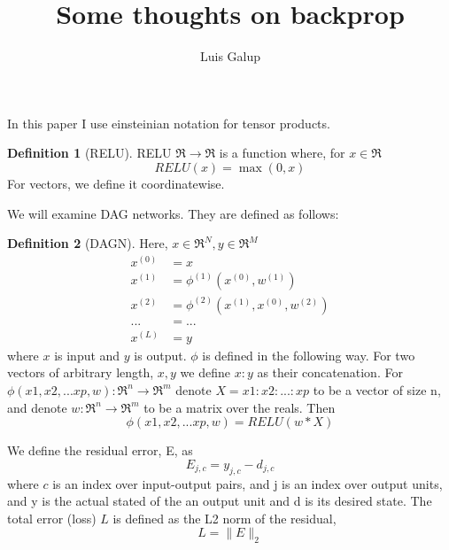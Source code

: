 \documentclass[11pt]{amsart}
\title{Some thoughts on backprop}
\author{Luis Galup}
\date{}
\theoremstyle{definition}
\newtheorem{definition}{Definition}[section]
\begin{document}
\maketitle

In this paper I use einsteinian notation for tensor products.

\begin{definition}[RELU]
\cite{boyd2007tutorial}
RELU $\Re \rightarrow \Re$ is a function where, for $x \in \Re$
\[
	RELU(x) = \max(0,x)
\]
For vectors, we define it coordinatewise.
\end{definition}

We will examine DAG networks. They are defined as follows:

\begin{definition}[DAGN]
Here, $x \in \Re ^ {N}, y \in \Re ^ M$
\begin{align*}
x^{(0)} & = x \\
x^{(1)} & = \phi ^{(1)}(x^{(0)}, w^{(1)}) \\
x^{(2)} & = \phi ^{(2)}(x^{(1)}, x^{(0)}, w^{(2)}) \\
... & = ... \\
x^{(L)} & = y
\end{align*}
where $x$ is input and $y$ is output.
$\phi$ is defined in the following way.
For two vectors of arbitrary length, $x,y$ we define $x:y$ as their concatenation.
For $\phi(x1,x2,...xp,w):\Re^n \rightarrow \Re^m$ denote $X = x1:x2:...:xp$ to be a vector of size n, and denote $w:\Re^n \rightarrow \Re^m$ to be a matrix over the reals. Then
\[
\phi(x1,x2,...xp,w) = RELU(w*X)
\]
\end{definition}
%
%
%

We define the residual error, E, as
\[
	E_{j,c} = y_{j,c} - d_{j,c}
\]
where $c$ is an index over input-output pairs, and j is an index over output units, and y is the actual stated of the an output unit and d is its desired state. 
The total error (loss) $L$ is defined as the L2 norm of the residual,
\[
	L = \| E \|_2
\]
\end{document}
